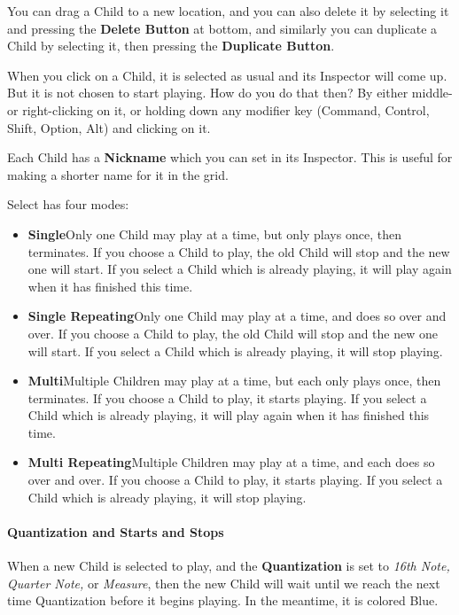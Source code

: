 \documentclass[twoside,10pt]{article}
\begin{document}
You can drag a Child to a new location, and you can also  delete it by selecting it and pressing the {\bf Delete Button} at bottom, and similarly you can duplicate a Child by selecting it, then pressing the {\bf Duplicate Button}. 

When you click on a Child, it is selected as usual and its Inspector will come up.  But it is not chosen to start playing.  How do you do that then?  By either middle- or right-clicking on it, or holding down any modifier key (Command, Control, Shift, Option, Alt) and clicking on it.

Each Child has a {\bf Nickname} which you can set in its Inspector.  This is useful for making a shorter name for it in the grid.



Select has four modes:

\begin{itemize}
\item{\bf Single}\quad Only one Child may play at a time, but only plays once, then terminates.  If you choose a Child to play, the old Child will stop and the new one will start.  If you select a Child which is already playing, it will play again when it has finished this time.
\item{\bf Single Repeating}\quad Only one Child may play at a time, and does so over and over.  If you choose a Child to play, the old Child will stop and the new one will start.  If you select a Child which is already playing, it will stop playing.
\item{\bf Multi}\quad Multiple Children may play at a time, but each only plays once, then terminates.  If you choose a Child to play, it starts playing.   If you select a Child which is already playing, it will play again when it has finished this time.
\item{\bf Multi Repeating}\quad Multiple Children may play at a time, and each does so over and over.  If you choose a Child to play, it starts playing.  If you select a Child which is already playing, it will stop playing.
\end{itemize}

\paragraph{Quantization and Starts and Stops}

When a new Child is selected to play, and the {\bf Quantization} is set to {\it 16th Note, Quarter Note,} or {\it Measure}, then the new Child will wait until we reach the next time Quantization before it begins playing.  In the meantime, it is colored Blue.
\end{document}
